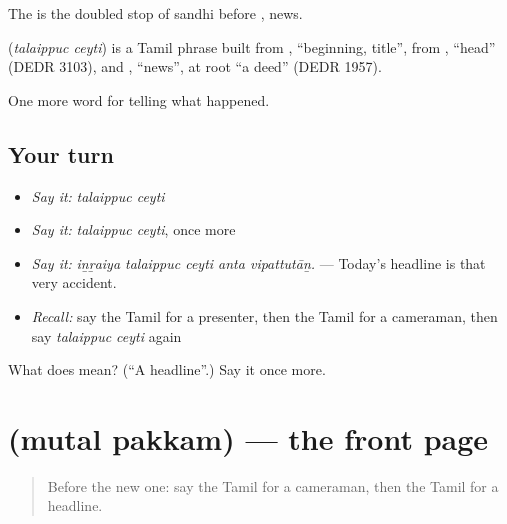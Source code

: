 The  is the doubled stop of sandhi before , news.

\begin{cousinweb}
\textbf{ } (\emph{talaippuc ceyti}) is a Tamil phrase built from , \textquotedblleft{}beginning, title\textquotedblright{}, from , \textquotedblleft{}head\textquotedblright{} (DEDR 3103), and , \textquotedblleft{}news\textquotedblright{}, at root \textquotedblleft{}a deed\textquotedblright{} (DEDR 1957).
\end{cousinweb}

\begin{grammarlens}[title={What you've built}]
One more word for telling what happened.
\end{grammarlens}

\subsection*{Your turn}
\begin{itemize}
\raggedright
  \item \emph{Say it:} \emph{talaippuc ceyti}
  \item \emph{Say it:} \emph{talaippuc ceyti}, once more
  \item \emph{Say it:} \emph{iṉṟaiya talaippuc ceyti anta vipattutāṉ.} — Today's headline is that very accident.
  \item \emph{Recall:} say the Tamil for a presenter, then the Tamil for a cameraman, then say \emph{talaippuc ceyti} again
\end{itemize}

\begin{tcolorbox}[breakable,colback=teal!4,colframe=teal!35!black,title={Before you move on}]
What does   mean? (\textquotedblleft{}A headline\textquotedblright{}.) Say it once more.
\end{tcolorbox}
\section[\texorpdfstring{\ta{முதல்} \ta{பக்கம்} (mutal pakkam)}{முதல் பக்கம் (mutal pakkam)}]{  (mutal pakkam) — the front page}

\label{lesson:TA-C306-mutal-pakkam}



\begin{quote}
Before the new one: say the Tamil for a cameraman, then the Tamil for a headline.
\end{quote}

